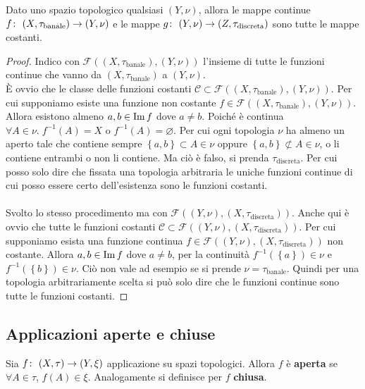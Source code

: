 \begin{theorem}
	Dato uno spazio topologico qualsiasi $(Y,\nu)$, allora le mappe continue $f \colon\ (X,\tau_{\text{banale}}) \rightarrow (Y,\nu)$ e le mappe $g \colon\ (Y,\nu) \rightarrow (Z,\tau_{\text{discreta}})$ sono tutte le mappe costanti.
\end{theorem}
\begin{proof}
	Indico con $\mathcal{F}((X,\tau_{\text{banale}}),(Y,\nu))$ l'insieme di tutte le funzioni continue che vanno da $(X,\tau_{\text{banale}})$ a $(Y,\nu)$. \\ È ovvio che le classe delle funzioni costanti $\mathcal{C} \subset \mathcal{F}((X,\tau_{\text{banale}}),(Y,\nu))$. Per cui supponiamo esiste una funzione non costante $f \in \mathcal{F}((X,\tau_{\text{banale}}),(Y,\nu))$. Allora esistono almeno $a,b \in \operatorname{Im}{f}$ dove $a \neq b$. Poiché è continua $\forall A \in \nu . \; f^{-1}(A) = X$ o $f^{-1}(A) = \varnothing$. Per cui ogni topologia $\nu$ ha almeno un aperto tale che contiene sempre $\left\{a,b\right\} \subset A \in \nu$ oppure $\left\{a,b\right\} \not\subset A \in \nu$, o li contiene entrambi o non li contiene. Ma ciò è falso, si prenda $\tau_{\text{discreta}}$. Per cui posso solo dire che fissata una topologia arbitraria le uniche funzioni continue di cui posso essere certo dell'esistenza sono le funzioni costanti. \\ \\
	
	Svolto lo stesso procedimento ma con $\mathcal{F}((Y,\nu), (X,\tau_{\text{discreta}}))$. Anche qui è ovvio che tutte le funzioni costanti $\mathcal{C} \subset \mathcal{F}((Y,\nu), (X,\tau_{\text{discreta}}))$. Per cui supponiamo esista una funzione continua $f \in \mathcal{F}((Y,\nu), (X,\tau_{\text{discreta}}))$ non costante. Allora $a,b \in \operatorname{Im}{f}$ dove $a \neq b$, per la continuità $f^{-1}(\left\{a\right\}) \in \nu $ e $f^{-1}(\left\{b\right\}) \in \nu$. Ciò non vale ad esempio se si prende $\nu = \tau_{\text{banale}}$. Quindi per una topologia arbitrariamente scelta si può solo dire che le funzioni continue sono tutte le funzioni costanti.
\end{proof}



\subsection{\textcolor{TopGener}{\textbf{Applicazioni aperte e chiuse}}}



\begin{definition}
	Sia $f \colon\ (X,\tau) \rightarrow (Y,\xi)$ applicazione su spazi topologici. Allora $f$ è \textbf{aperta} se $\forall A \in \tau$, $f(A) \in \xi$. Analogamente si definisce per $f$ \textbf{chiusa}.
\end{definition}

